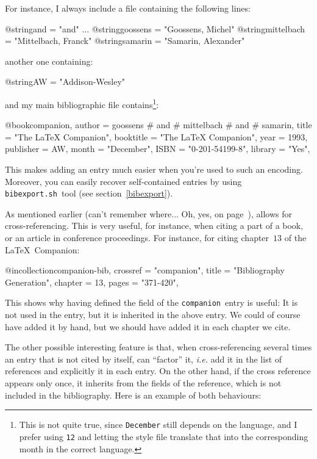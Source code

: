 For instance, I always include a  file containing the
following lines:
\begin{verbatimtab}
@string{and = "and"}
...
@string{goossens    	= "Goossens, Michel"}
@string{mittelbach  	= "Mittelbach, Franck"}
@string{samarin		= "Samarin, Alexander"}
\end{verbatimtab}
another one containing:
\begin{verbatimtab}
@string{AW		= "Addison-Wesley"}
\end{verbatimtab}
and my main bibliographic file contains\footnote{This is not quite
  true, since \texttt{December} still depends on the language, and I
  prefer using \texttt{12} and letting the style file translate that
  into the corresponding month in the correct language.}:
\begin{verbatimtab}
@book{companion,
  author	= goossens # and # mittelbach # and # samarin,
  title		= "The {{\LaTeX}} {C}ompanion",
  booktitle	= "The {{\LaTeX}} {C}ompanion",
  year 		= 1993,
  publisher	= AW,
  month		= "December",
  ISBN 		= "0-201-54199-8",
  library 	= "Yes",
}
\end{verbatimtab}
This makes adding an entry much easier when you're used to such an
encoding. Moreover, you can easily recover self-contained entries by using
\texttt{bibexport.sh}~tool (see section~\ref{bibexport}).



\label{crossref} 
As mentioned earlier (can't remember where... Oh, yes, on
page~\pageref{cetaitla}), \bt allows for cross-referencing. This is
very useful, for instance, when citing a part of a book, or an article
in conference proceedings. For instance, for citing chapter~$13$ of
the \LaTeX~Companion:
\begin{verbatimtab}
@incollection{companion-bib,
  crossref 	= "companion",
  title		= "Bibliography Generation",
  chapter	= 13,
  pages		= "371-420",
}
\end{verbatimtab}
This shows why having defined the  field
of the \verb+companion+~entry is useful: It is not used in the  entry,
but 
it is inherited in the above  entry. We could of
course have added it by hand, but we should have added it in each
chapter we cite.

The other possible interesting feature is that, when cross-referencing
several times an entry that is not cited by itself, \bt can
``factor'' it, \emph{i.e.} add it in the list of references and
explicitly  it in each entry. On the other hand, if the cross
reference appears only once, it inherits from the fields of the
reference, which is not included in the bibliography. 
Here is an example of both behaviours:

